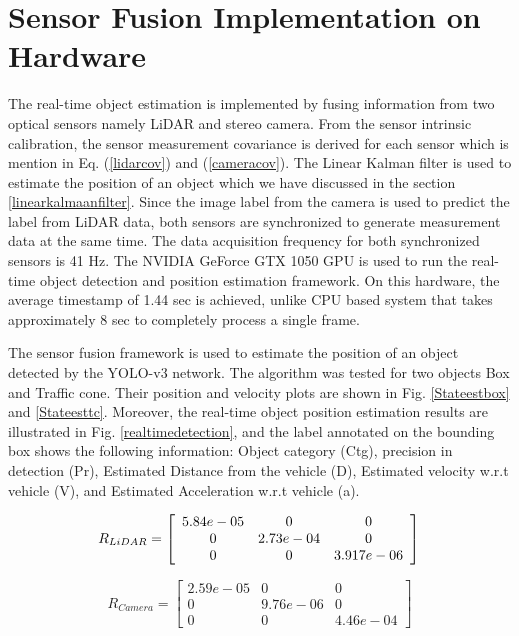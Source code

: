 \section{Sensor Fusion Implementation on Hardware}
The real-time object estimation is implemented by fusing information from two optical sensors namely LiDAR and stereo camera. From the sensor intrinsic calibration, the sensor measurement covariance is derived for each sensor which is mention in Eq. (\ref{lidarcov}) and (\ref{cameracov}). The Linear Kalman filter is used to estimate the position of an object which we have discussed in the section \ref{linearkalmaanfilter}. Since the image label from the camera is used to predict the label from LiDAR data, both sensors are synchronized to generate measurement data at the same time. The data acquisition frequency for both synchronized sensors is 41 Hz. The NVIDIA GeForce GTX 1050 GPU is used to run the real-time object detection and position estimation framework. On this hardware, the average timestamp of 1.44 sec is achieved, unlike CPU based system that takes approximately 8 sec to completely process a single frame. 

The sensor fusion framework is used to estimate the position of an object detected by the YOLO-v3 network. The algorithm was tested for two objects Box and Traffic cone. Their position and velocity plots are shown in Fig. \ref{Stateestbox} and \ref{Stateesttc}. Moreover, the real-time object position estimation results are illustrated in Fig. \ref{realtimedetection}, and the label annotated on the bounding box shows the following information: Object category (Ctg), precision in detection (Pr), Estimated Distance from the vehicle (D), Estimated velocity w.r.t vehicle (V), and Estimated Acceleration w.r.t vehicle (a).

\vspace{5cm}
   
\begin{equation}
    R_{LiDAR} = 
    \left[\begin{array}{ccc}
    5.84e-05 & 0 & 0 \\
    0 & 2.73e-04 & 0 \\
    0 & 0 & 3.917e-06
    \end{array}\right] \\
    \label{lidarcov}
\end{equation}

\vspace{1cm}

\begin{equation}
    R_{Camera} =
    \left[\begin{array}{ccc}
    2.59e-05 & 0 & 0 \\
    0 & 9.76e-06 & 0 \\
    0 & 0 & 4.46e-04
    \end{array}\right]
    \label{cameracov}
\end{equation}

